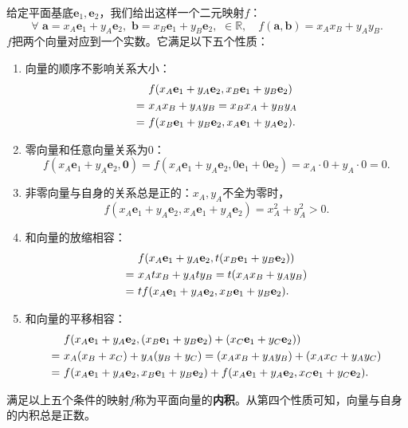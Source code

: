 \documentclass[12pt,UTF8]{ctexbook}
\begin{document}
给定平面基底$\mathbf{e}_1, \mathbf{e}_2$，我们给出这样一个二元映射$f$：
$$ \forall \,\, \mathbf{a} = x_A\mathbf{e}_1 + y_A\mathbf{e}_2, \,\, \mathbf{b} = x_B\mathbf{e}_1 + y_B\mathbf{e}_2, \,\, \in \mathbb{R}, \quad f(\mathbf{a}, \mathbf{b}) = x_Ax_B + y_Ay_B.$$
$f$把两个向量对应到一个实数。它满足以下五个性质：
\begin{enumerate}
    \item 向量的顺序不影响关系大小：
    \begin{align}
         & f(x_A\mathbf{e}_1 + y_A\mathbf{e}_2, x_B\mathbf{e}_1 + y_B\mathbf{e}_2) \notag \\
        =\,\,& x_Ax_B + y_A y_B = x_Bx_A + y_By_A \notag \\
        =\,\,& f(x_B\mathbf{e}_1 + y_B\mathbf{e}_2, x_A\mathbf{e}_1 + y_A\mathbf{e}_2). \notag
    \end{align}
    \item 零向量和任意向量关系为$0$：
    $$f(x_A\mathbf{e}_1 + y_A\mathbf{e}_2, \mathbf{0}) = f(x_A\mathbf{e}_1 + y_A\mathbf{e}_2, 0\mathbf{e}_1 + 0\mathbf{e}_2) = x_A\cdot 0 + y_A\cdot 0 = 0.$$
    \item 非零向量与自身的关系总是正的：$x_A, y_A$不全为零时，
    $$f(x_A\mathbf{e}_1 + y_A\mathbf{e}_2, x_A\mathbf{e}_1 + y_A\mathbf{e}_2) = x_A^2 + y_A^2  > 0.$$
    \item 和向量的放缩相容：
    \begin{align}
        & f(x_A\mathbf{e}_1 + y_A\mathbf{e}_2, t(x_B\mathbf{e}_1 + y_B\mathbf{e}_2)) \notag \\
        =\,\,& x_Atx_B + y_A ty_B = t(x_Ax_B + y_Ay_B) \notag \\
        =\,\,& tf(x_A\mathbf{e}_1 + y_A\mathbf{e}_2, x_B\mathbf{e}_1 + y_B\mathbf{e}_2). \notag 
    \end{align}
    \item 和向量的平移相容：
    \begin{align}
         & f(x_A\mathbf{e}_1 + y_A\mathbf{e}_2, (x_B\mathbf{e}_1 + y_B\mathbf{e}_2) + (x_C\mathbf{e}_1 + y_C\mathbf{e}_2)) \notag \\
         =\,\,& x_A(x_B + x_C) + y_A (y_B + y_C) = (x_Ax_B + y_Ay_B) + (x_Ax_C + y_Ay_C) \notag \\
         =\,\,& f(x_A\mathbf{e}_1 + y_A\mathbf{e}_2, x_B\mathbf{e}_1 + y_B\mathbf{e}_2) + f(x_A\mathbf{e}_1 + y_A\mathbf{e}_2, x_C\mathbf{e}_1 + y_C\mathbf{e}_2). \notag
    \end{align}     
\end{enumerate}
满足以上五个条件的映射$f$称为平面向量的\textbf{内积}。从第四个性质可知，向量与自身的内积总是正数。
\end{document}
